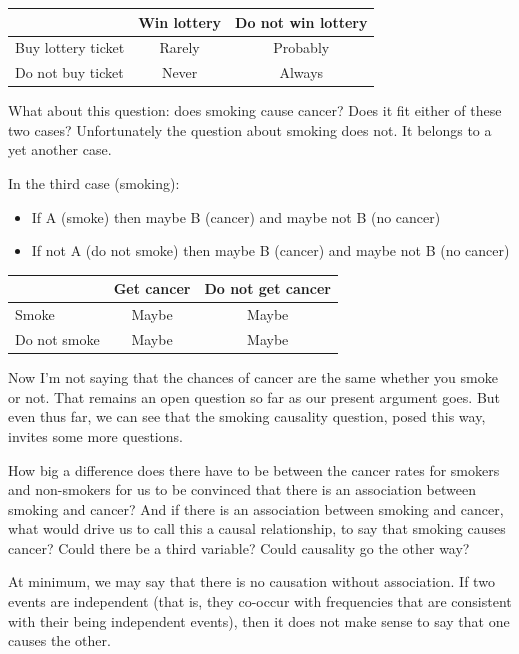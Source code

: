 \documentclass[
  openany]{book}
\providecommand{\tightlist}{%
  \setlength{\itemsep}{0pt}\setlength{\parskip}{0pt}}
\begin{document}
\begin{longtable}[]{@{}lcc@{}}
\toprule()
& Win lottery & Do not win lottery \\
\midrule()
\endhead
Buy lottery ticket & Rarely & Probably \\
Do not buy ticket & Never & Always \\
\bottomrule()
\end{longtable}

What about this question: does smoking cause cancer? Does it fit either of these two cases? Unfortunately the question about smoking does not. It belongs to a yet another case.

In the third case (smoking):

\begin{itemize}
\tightlist
\item
  If A (smoke) then maybe B (cancer) and maybe not B (no cancer)
\item
  If not A (do not smoke) then maybe B (cancer) and maybe not B (no cancer)
\end{itemize}

\begin{longtable}[]{@{}lcc@{}}
\toprule()
& Get cancer & Do not get cancer \\
\midrule()
\endhead
Smoke & Maybe & Maybe \\
Do not smoke & Maybe & Maybe \\
\bottomrule()
\end{longtable}

Now I'm not saying that the chances of cancer are the same whether you smoke or not. That remains an open question so far as our present argument goes. But even thus far, we can see that the smoking causality question, posed this way, invites some more questions.

How big a difference does there have to be between the cancer rates for smokers and non-smokers for us to be convinced that there is an association between smoking and cancer? And if there is an association between smoking and cancer, what would drive us to call this a causal relationship, to say that smoking causes cancer? Could there be a third variable? Could causality go the other way?

At minimum, we may say that there is no causation without association. If two events are independent (that is, they co-occur with frequencies that are consistent with their being independent events), then it does not make sense to say that one causes the other.
\end{document}
